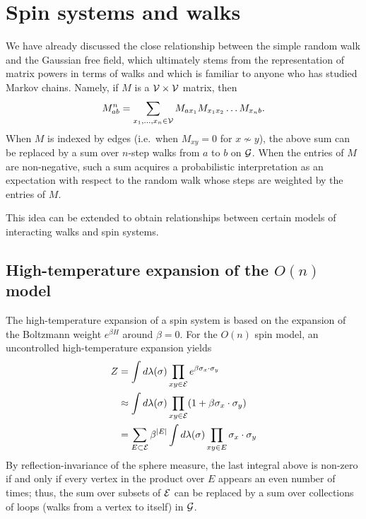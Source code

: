 \section{Spin systems and walks}

We have already discussed the close relationship between the simple random walk
and the Gaussian free field, which ultimately stems from the representation of
matrix powers in terms of walks and which is familiar to anyone
who has studied Markov chains. Namely, if $M$ is a $\mathcal{V}\times\mathcal{V}$
matrix, then
\begin{equation}
M^n_{ab} = \sum_{x_1,\ldots,x_n\in\mathcal{V}} M_{ax_1} M_{x_1x_2} \ldots M_{x_nb}.
\end{equation}
When $M$ is indexed by edges (i.e.\ when $M_{xy} = 0$ for $x \not\sim y$), the
above sum can be replaced by a sum over $n$-step walks from $a$ to $b$ on $\mathcal{G}$.
When the entries of $M$ are non-negative, such a sum acquires a probabilistic
interpretation as an expectation with respect to the random walk whose steps
are weighted by the entries of $M$.

This idea can be extended to obtain relationships between certain models of
interacting walks and spin systems.


\subsection{High-temperature expansion of the \texorpdfstring{$O(n)$}{O(n)} model}


The high-temperature expansion of a spin system is based on the expansion of the
Boltzmann weight $e^{\beta H}$ around $\beta = 0$.
For the $O(n)$ spin model, an uncontrolled high-temperature expansion yields
\begin{align}
Z 	&= \int d\lambda(\sigma) \prod_{xy\in\mathcal{E}} e^{\beta \sigma_x \cdot \sigma_y} \\
	&\approx \int d\lambda(\sigma) \prod_{xy\in\mathcal{E}} (1 + \beta \sigma_x \cdot \sigma_y) \\
	&= \sum_{E \subset \mathcal{E}} \beta^{|E|} \int d\lambda(\sigma) \prod_{xy \in E} \sigma_x \cdot \sigma_y
\end{align}
By reflection-invariance of the sphere measure, the last integral above is non-zero
if and only if every vertex in the product over $E$ appears an even number of times;
thus, the sum over subsets of $\mathcal{E}$ can be replaced by a sum over collections of
loops (walks from a vertex to itself) in $\mathcal{G}$.

